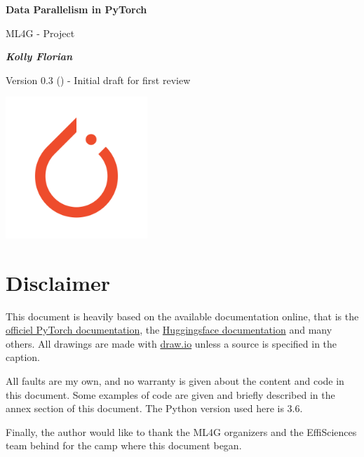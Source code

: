 \documentclass{article}
\begin{document}
\begin{titlepage}
  \begin{center}
    \Huge
    \textbf{\textcolor{def}{Data Parallelism in PyTorch}}
    \vspace{0.9cm}

    \LARGE
    ML4G - Project

    \vspace{1.9cm}
    \Large
    \textbf{\emph{Kolly Florian}}
    \vspace{5cm}
  \end{center}
  Version 0.3 (\DTMnow) - Initial draft for first review
  \begin{center}
    \vspace{5cm}
    \includegraphics[width=0.4\textwidth]{images/pytorch-logo.png}
    \vspace{10cm}
  \end{center}
\end{titlepage}

\setlength{\parindent}{0em}
\setlength{\parskip}{0.3em}

\tableofcontents
\newpage

\section{Disclaimer}
This document is heavily based on the available documentation online, that is the \href{https://pytorch.org/docs/stable/index.html}{officiel PyTorch documentation}, the \href{https://huggingface.co/docs}{Huggingsface documentation} and many others. All drawings are made with \href{https://www.draw.io}{draw.io} unless a source is specified in the caption.

All faults are my own, and no warranty is given about the content and code in this document. Some examples of code are given and briefly described in the annex section of this document. The Python version used here is 3.6.

Finally, the author would like to thank the ML4G organizers and the EffiSciences team behind for the camp where this document began.
\end{document}
